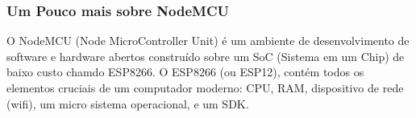 \documentclass{beamer}
\begin{document}
\begin{frame}
\frametitle{Um Pouco mais sobre NodeMCU}
\begin{minipage}{\textwidth}
	
	O NodeMCU (Node MicroController Unit) é um ambiente de desenvolvimento de software e hardware abertos construído sobre um SoC (Sistema em um Chip) de baixo custo chamdo ESP8266. O ESP8266 (ou ESP12), contém todos os elementos cruciais de um computador moderno: CPU, RAM, dispositivo de rede (wifi), um micro sistema operacional, e um SDK.\cite{node_mcu_acronimo}
	
	

\end{minipage}
\end{frame}
\end{document}
